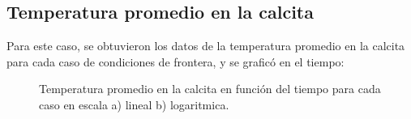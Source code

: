\documentclass{article}
\begin{document}
\subsection*{Temperatura promedio en la calcita}
Para este caso, se obtuvieron los datos de la temperatura promedio en la calcita para cada caso de condiciones de frontera, y se graficó en el tiempo:

\begin{figure}[H]
    \centering
    \caption{Temperatura promedio en la calcita en función del tiempo para cada caso en escala a) lineal b) logaritmica.}
    \label{fig:CondicionesFijasTemp}
\end{figure}
\end{document}
